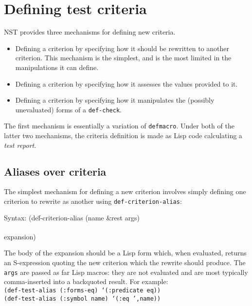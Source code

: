 \section{Defining test criteria}
NST provides three mechanisms for defining new criteria.
\begin{itemize}
\item Defining a criterion by specifying how it should be rewritten to
  another criterion.  This mechanism is the simplest, and is the most
  limited in the manipulations it can define.
\item Defining a criterion by specifying how it assesses the values
  provided to it.
\item Defining a criterion by specifying how it manipulates the
  (possibly unevaluated) forms of a \texttt{def-check}.
\end{itemize}
The first mechanism is essentially a variation of \texttt{defmacro}.
Under both of the latter two mechanisms, the criteria definition is
made as Lisp code calculating a \emph{test report}.

\subsection{Aliases over criteria}
The simplest mechanism for defining a new criterion involves simply
defining one criterion to rewrite as another using
\texttt{def-criterion-alias}:
%
{\ttfamily\begin{tabbing}
\textrm{Syntax: 
}(de\=f-criterion-alias (name \&rest args)
\\ \> [ documentation ]
\\ \> expansion)
\end{tabbing}}
The body of the expansion should be a Lisp form which, when evaluated,
returns an S-expression quoting the new criterion which the rewrite
should produce.  The \texttt{args} are passed as far Lisp macros: they
are not evaluated and are most typically comma-inserted into a
backquoted result.  For example:
\\ \texttt{(def-test-alias (:forms-eq) `(:predicate eq))}
\\ \texttt{(def-test-alias (:symbol name) `(:eq ',name))}

